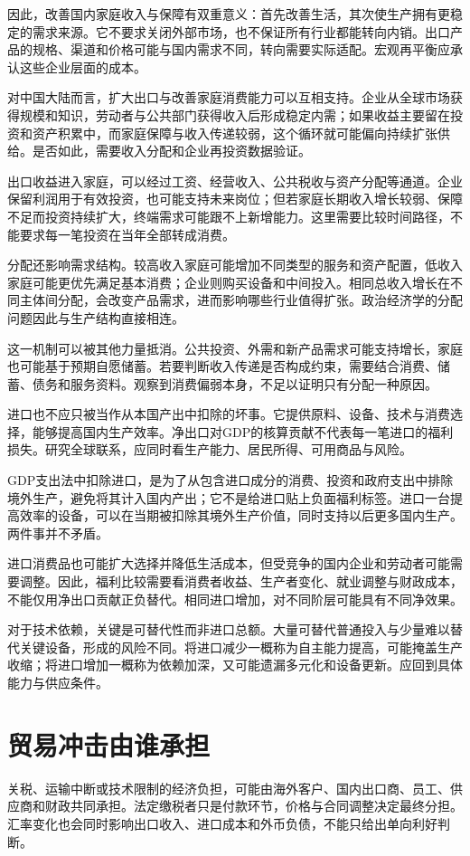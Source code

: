 \documentclass[UTF8,fontset=fandol,zihao=-4,oneside,openany]{ctexbook}
\begin{document}
因此，改善国内家庭收入与保障有双重意义：首先改善生活，其次使生产拥有更稳定的需求来源。它不要求关闭外部市场，也不保证所有行业都能转向内销。出口产品的规格、渠道和价格可能与国内需求不同，转向需要实际适配。宏观再平衡应承认这些企业层面的成本。

对中国大陆而言，扩大出口与改善家庭消费能力可以互相支持。企业从全球市场获得规模和知识，劳动者与公共部门获得收入后形成稳定内需；如果收益主要留在投资和资产积累中，而家庭保障与收入传递较弱，这个循环就可能偏向持续扩张供给。是否如此，需要收入分配和企业再投资数据验证。

\label{arg:P218}
出口收益进入家庭，可以经过工资、经营收入、公共税收与资产分配等通道。企业保留利润用于有效投资，也可能支持未来岗位；但若家庭长期收入增长较弱、保障不足而投资持续扩大，终端需求可能跟不上新增能力。这里需要比较时间路径，不能要求每一笔投资在当年全部转成消费。

分配还影响需求结构。较高收入家庭可能增加不同类型的服务和资产配置，低收入家庭可能更优先满足基本消费；企业则购买设备和中间投入。相同总收入增长在不同主体间分配，会改变产品需求，进而影响哪些行业值得扩张。政治经济学的分配问题因此与生产结构直接相连。

这一机制可以被其他力量抵消。公共投资、外需和新产品需求可能支持增长，家庭也可能基于预期自愿储蓄。若要判断收入传递是否构成约束，需要结合消费、储蓄、债务和服务资料。观察到消费偏弱本身，不足以证明只有分配一种原因。

进口也不应只被当作从本国产出中扣除的坏事。它提供原料、设备、技术与消费选择，能够提高国内生产效率。净出口对GDP的核算贡献不代表每一笔进口的福利损失。研究全球联系，应同时看生产能力、居民所得、可用商品与风险。

\label{arg:P219}
GDP支出法中扣除进口，是为了从包含进口成分的消费、投资和政府支出中排除境外生产，避免将其计入国内产出；它不是给进口贴上负面福利标签。进口一台提高效率的设备，可以在当期被扣除其境外生产价值，同时支持以后更多国内生产。两件事并不矛盾。

进口消费品也可能扩大选择并降低生活成本，但受竞争的国内企业和劳动者可能需要调整。因此，福利比较需要看消费者收益、生产者变化、就业调整与财政成本，不能仅用净出口贡献正负替代。相同进口增加，对不同阶层可能具有不同净效果。

对于技术依赖，关键是可替代性而非进口总额。大量可替代普通投入与少量难以替代关键设备，形成的风险不同。将进口减少一概称为自主能力提高，可能掩盖生产收缩；将进口增加一概称为依赖加深，又可能遗漏多元化和设备更新。应回到具体能力与供应条件。

\section{贸易冲击由谁承担}
关税、运输中断或技术限制的经济负担，可能由海外客户、国内出口商、员工、供应商和财政共同承担。法定缴税者只是付款环节，价格与合同调整决定最终分担。汇率变化也会同时影响出口收入、进口成本和外币负债，不能只给出单向利好判断。
\end{document}
